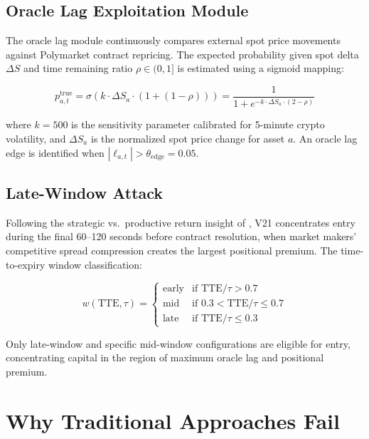 \documentclass[11pt,a4paper]{article}
\begin{document}
\subsection{Oracle Lag Exploitation Module}

The oracle lag module continuously compares external spot price movements against Polymarket contract repricing. The expected probability given spot delta $\Delta S$ and time remaining ratio $\rho \in (0, 1]$ is estimated using a sigmoid mapping:

\begin{equation}\label{eq:expected_probability}
    p^{\text{true}}_{a,t} = \sigma\left(k \cdot \Delta S_a \cdot (1 + (1 - \rho))\right) = \frac{1}{1 + e^{-k \cdot \Delta S_a \cdot (2 - \rho)}}
\end{equation}

\noindent where $k = 500$ is the sensitivity parameter calibrated for 5-minute crypto volatility, and $\Delta S_a$ is the normalized spot price change for asset $a$. An oracle lag edge is identified when $|\ell_{a,t}| > \theta_{\text{edge}} = 0.05$.

\subsection{Late-Window Attack}

Following the strategic vs.\ productive return insight of \citet{maresca2025strategic}, V21 concentrates entry during the final 60--120 seconds before contract resolution, when market makers' competitive spread compression creates the largest positional premium. The time-to-expiry window classification:

\begin{equation}\label{eq:time_window}
    w(\text{TTE}, \tau) = \begin{cases}
        \text{early} & \text{if } \text{TTE}/\tau > 0.7 \\
        \text{mid} & \text{if } 0.3 < \text{TTE}/\tau \leq 0.7 \\
        \text{late} & \text{if } \text{TTE}/\tau \leq 0.3
    \end{cases}
\end{equation}

\noindent Only late-window and specific mid-window configurations are eligible for entry, concentrating capital in the region of maximum oracle lag and positional premium.

\section{Why Traditional Approaches Fail}\label{sec:failures}
\end{document}
